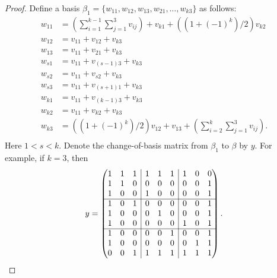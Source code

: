 \begin{proof}
Define a basis $\beta_1=\{w_{11}, w_{12}, w_{13}, w_{21}, \ldots, w_{k3}\}$ as follows:
\begin{equation*}
\begin{split}
w_{11}&= (\sum_{i=1}^{k-1} \sum_{j=1}^3 v_{ij}) +v_{k1} +((1+(-1)^k)/2)v_{k2}  \\ 
w_{12}&= v_{11} + v_{12} + v_{k3}\\
w_{13}&= v_{11} + v_{21} + v_{k3}\\
w_{s1}&= v_{11} + v_{(s-1)3} + v_{k3}\\
w_{s2}&= v_{11} + v_{s2} + v_{k3}\\
w_{s3}&= v_{11} + v_{(s+1)1} + v_{k3}\\
w_{k1}&= v_{11} + v_{(k-1)3} + v_{k3}\\
w_{k2}&= v_{11} + v_{k2} + v_{k3}\\
w_{k3}&= ((1+(-1)^k)/2)v_{12} +v_{13} + (\sum_{i=2}^{k} \sum_{j=1}^3 v_{ij}). \\
\end{split}
\end{equation*}
Here $1<s<k.$  Denote the change-of-basis matrix from $\beta_1$ to $\beta$ by $y$. For example, if $k=3$, then
\begin{equation*}
y=
\begin{pmatrix}
1&1& \multicolumn{1}{c|}{1}&1&1&\multicolumn{1}{c|}{1}&1&0&0 \\
1&1& \multicolumn{1}{c|}{0}&0&0&\multicolumn{1}{c|}{0}&0&0&1 \\
1&0& \multicolumn{1}{c|}{0}&1&0&\multicolumn{1}{c|}{0}&0&0&1 \\ \cline{1-9}
1&0& \multicolumn{1}{c|}{1}&0&0&\multicolumn{1}{c|}{0}&0&0&1 \\
1&0& \multicolumn{1}{c|}{0}&0&1&\multicolumn{1}{c|}{0}&0&0&1 \\
1&0& \multicolumn{1}{c|}{0}&0&0&\multicolumn{1}{c|}{0}&1&0&1 \\\cline{1-9}
1&0& \multicolumn{1}{c|}{0}&0&0&\multicolumn{1}{c|}{1}&0&0&1 \\
1&0& \multicolumn{1}{c|}{0}&0&0&\multicolumn{1}{c|}{0}&0&1&1 \\
0&0& \multicolumn{1}{c|}{1}&1&1&\multicolumn{1}{c|}{1}&1&1&1 \\
\end{pmatrix}.
\end{equation*}


\end{proof}
